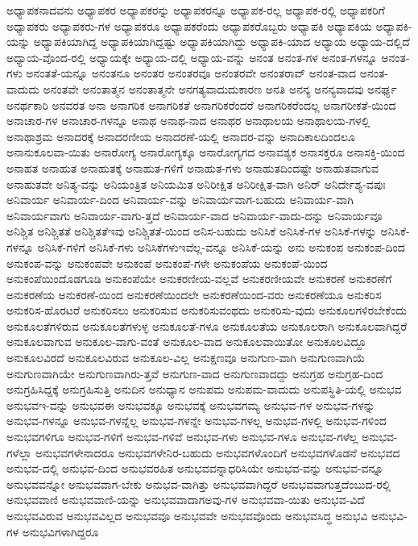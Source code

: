 {ಅಧ್ಯಾಪಕನಾದವನು
ಅಧ್ಯಾಪಕರ
ಅಧ್ಯಾಪಕರನ್ನು
ಅಧ್ಯಾಪಕರನ್ನೂ
ಅಧ್ಯಾಪಕ-ರಲ್ಲ
ಅಧ್ಯಾಪಕ-ರಲ್ಲಿ
ಅಧ್ಯಾಪಕರಿಗೆ
ಅಧ್ಯಾಪಕರು
ಅಧ್ಯಾಪಕರು-ಗಳ
ಅಧ್ಯಾಪಕರೂ
ಅಧ್ಯಾಪಕರೆಂದು
ಅಧ್ಯಾಪಕರೊಬ್ಬರು
ಅಧ್ಯಾಪಕಿ
ಅಧ್ಯಾಪಕಿಯ
ಅಧ್ಯಾಪಕಿ-ಯನ್ನು
ಅಧ್ಯಾಪಕಿಯಾಗಿದ್ದ
ಅಧ್ಯಾಪಕಿಯಾಗಿದ್ದಷ್ಟು
ಅಧ್ಯಾಪಕಿಯಾಗಿದ್ದು
ಅಧ್ಯಾಪಕಿ-ಯಾದ
ಅಧ್ಯಾಯ
ಅಧ್ಯಾಯ-ದಲ್ಲಿದೆ
ಅಧ್ಯಾಯ-ವೊಂದ-ರಲ್ಲಿ
ಅಧ್ಯಾಯಕ್ಕೇ
ಅಧ್ಯಾಯ-ದಲ್ಲಿ
ಅಧ್ಯಾಯ-ವನ್ನು
ಅನಂತ
ಅನಂತ-ಗಳ
ಅನಂತ-ಗಳನ್ನೂ
ಅನಂತ-ಗಳು
ಅನಂತತೆ-ಯನ್ನೂ
ಅನಂತನೂ
ಅನಂತರ
ಅನಂತರವೂ
ಅನಂತರವೇ
ಅನಂತರಾವ್
ಅನಂತ-ವಾದ
ಅನಂತ-ವಾದುದು
ಅನಂತವೇ
ಅನಂತಾತ್ಮನ
ಅನಂತಾತ್ಮನೇ
ಅನಗತ್ಯವಾದುದುಕಾರಣ
ಅನತಿ
ಅನನ್ಯ
ಅನನ್ಯವಾದವು
ಅನರ್ಘ್ಯ
ಅನರ್ಥಕಾರಿ
ಅನವರತ
ಅನಾ
ಅನಾಗರಿಕ
ಅನಾಗರಿಕತೆ
ಅನಾಗರಿಕರೆಂದರೆ
ಅನಾಗರಿಕರೆಂದಲ್ಲ
ಅನಾಗರೀಕತೆ-ಯಿಂದ
ಅನಾಚಾರ-ಗಳ
ಅನಾಚಾರ-ಗಳನ್ನೂ
ಅನಾಥ
ಅನಾಥ-ನಾದ
ಅನಾಥರ
ಅನಾಥಾಲಯ
ಅನಾಥಾಲಯ-ಗಳಲ್ಲಿ
ಅನಾಥಾಶ್ರಮ
ಅನಾದರಕ್ಕೆ
ಅನಾದರಣೀಯ
ಅನಾದರಣೆ-ಯಲ್ಲಿ
ಅನಾದರ-ವನ್ನು
ಅನಾದಿಕಾಲದಿಂದಲೂ
ಅನಾನುಕೂಲವಾ-ಯಿತು
ಅನಾರೋಗ್ಯ
ಅನಾರೋಗ್ಯಕ್ಕೂ
ಅನಾರೋಗ್ಯಗದ
ಅನಾವಶ್ಯಕ
ಅನಾಸಕ್ತರೂ
ಅನಾಸಕ್ತಿ-ಯಿಂದ
ಅನಾಹತ
ಅನಾಹುತ
ಅನಾಹುತಕ್ಕೆ
ಅನಾಹುತ-ಗಳಿಗೆ
ಅನಾಹುತ-ಗಳು
ಅನಾಹುತದಿಂದಷ್ಟೇ
ಅನಾಹುತವಾಗುವ
ಅನಾಹುತವೇ
ಅನಿತ್ಯ-ವನ್ನು
ಅನಿಯಂತ್ರಿತ
ಅನಿಯಮಿತ
ಅನಿರೀಕ್ಷಿತ
ಅನಿರೀಕ್ಷಿತ-ವಾಗಿ
ಅನಿರ್
ಅನಿರ್ದೇಶ್ಯ-ವಪುಃ
ಅನಿವಾರ್ಯ
ಅನಿವಾರ್ಯ-ದಿಂದ
ಅನಿವಾರ್ಯ-ವನ್ನು
ಅನಿವಾರ್ಯವಾಗ-ಬಹುದು
ಅನಿವಾರ್ಯ-ವಾಗಿ
ಅನಿವಾರ್ಯವಾಗು
ಅನಿವಾರ್ಯ-ವಾಗು-ತ್ತದೆ
ಅನಿವಾರ್ಯ-ವಾದ
ಅನಿವಾರ್ಯ-ವಾದು-ದನ್ನು
ಅನಿವಾರ್ಯವೂ
ಅನಿಶ್ಚಿತ
ಅನಿಶ್ಚಿತತೆ
ಅನಿಶ್ಚಿತತೆಇವು
ಅನಿಶ್ಚಿತತೆ-ಯಿಂದ
ಅನಿಸ-ಬಹುದು
ಅನಿಸಿಕೆ
ಅನಿಸಿಕೆ-ಗಳ
ಅನಿಸಿಕೆ-ಗಳನ್ನು
ಅನಿಸಿಕೆ-ಗಳನ್ನೂ
ಅನಿಸಿಕೆ-ಗಳಿಗೆ
ಅನಿಸಿಕೆ-ಗಳು
ಅನಿಸಿಕೆಗಳುಇವೆಲ್ಲ-ವನ್ನೂ
ಅನಿಸಿಕೆ-ಯನ್ನು
ಅನು
ಅನುಕಂಪ
ಅನುಕಂಪ-ದಿಂದ
ಅನುಕಂಪ-ವನ್ನು
ಅನುಕಂಪವೇ
ಅನುಕಂಪೆ
ಅನುಕಂಪೆ-ಗಳೇ
ಅನುಕಂಪೆಯ
ಅನುಕಂಪೆ-ಯಿಂದ
ಅನುಕಂಪೆಯಿಂದೊಡಗೂಡಿ
ಅನುಕಂಪೆಯೇ
ಅನುಕರಣೀಯ-ವಲ್ಲವೆ
ಅನುಕರಣೀಯವೇ
ಅನುಕರಣೆ
ಅನುಕರಣೆಗೆ
ಅನುಕರಣೆಯ
ಅನುಕರಣೆ-ಯಿಂದ
ಅನುಕರಣೆಯಿಂದಲೇ
ಅನುಕರಣೆಯಿಂದ-ವರು
ಅನುಕರಣೆಯೂ
ಅನುಕರಿಸ
ಅನುಕರಿಸ-ಹೊರಟರೆ
ಅನುಕರಿಸಲು
ಅನುಕರಿಸುವ
ಅನುಕರಿಸುವಂಥದು
ಅನುಕರಿಸು-ವುದು
ಅನುಕೂಲಗಳಿರಬೇಕೆಂದು
ಅನುಕೂಲತೆಗಳಿರುವ
ಅನುಕೂಲತೆಗಳುಳ್ಳ
ಅನುಕೂಲತೆ-ಗಳೂ
ಅನುಕೂಲತೆಯ
ಅನುಕೂಲರಾಗಿ
ಅನುಕೂಲವಾಗಿದ್ದರೆ
ಅನುಕೂಲವಾಗುವ
ಅನುಕೂಲ-ವಾಗು-ವಂತೆ
ಅನುಕೂಲ-ವಾದ
ಅನುಕೂಲವಾಯಿತೋ
ಅನುಕೂಲವಿದ್ದೂ
ಅನುಕೂಲವಿರದೆ
ಅನುಕೂಲವಿರುವ
ಅನುಕೂಲ-ವಿಲ್ಲ
ಅನುಕ್ಷಣವೂ
ಅನುಗುಣ-ವಾಗಿ
ಅನುಗುಣವಾಗಿಯೆ
ಅನುಗುಣವಾಗಿಯೇ
ಅನುಗುಣವಾಗಿರು-ತ್ತವೆ
ಅನುಗುಣ-ವಾದ
ಅನುಗುಣವಾದದ್ದು
ಅನುಗ್ರಹ
ಅನುಗ್ರಹ-ದಿಂದ
ಅನುಗ್ರಹಿಸಿದ್ದಕ್ಕೆ
ಅನುಗ್ರಹಿಸುತ್ತಿ
ಅನುದಿನ
ಅನುಧ್ಯಾನ
ಅನುಪಮ
ಅನುಪಮ-ವಾದುದು
ಅನುಪಸ್ಥಿತಿ-ಯಲ್ಲಿ
ಅನುಭವ
ಅನುಭವಇ-ವನ್ನು
ಅನುಭವಈ
ಅನುಭವಕ್ಕೂ
ಅನುಭವಕ್ಕೆ
ಅನುಭವಗಮ್ಯ
ಅನುಭವ-ಗಳ
ಅನುಭವ-ಗಳನ್ನು
ಅನುಭವ-ಗಳನ್ನೂ
ಅನುಭವ-ಗಳನ್ನೆಲ್ಲ
ಅನುಭವ-ಗಳನ್ನೇ
ಅನುಭವ-ಗಳಲ್ಲ
ಅನುಭವ-ಗಳಲ್ಲಿ
ಅನುಭವ-ಗಳಿಂದ
ಅನುಭವಗಳಿಗೂ
ಅನುಭವ-ಗಳಿಗೆ
ಅನುಭವ-ಗಳಿವೆ
ಅನುಭವ-ಗಳು
ಅನುಭವ-ಗಳೂ
ಅನುಭವ-ಗಳೆಲ್ಲ
ಅನುಭವ-ಗಳೆಲ್ಲಾ
ಅನುಭವಗಳೇನಾದರೂ
ಅನುಭವಗಳೇನಿರ-ಬಹುದು
ಅನುಭವಗಳೊಂದಿಗೆ
ಅನುಭವಗಳೊಡನೆ
ಅನುಭವದ
ಅನುಭವ-ದಲ್ಲಿ
ಅನುಭವ-ದಿಂದ
ಅನುಭವರಹಿತ
ಅನುಭವವನ್ನಾಧರಿಸಿಯೇ
ಅನುಭವ-ವನ್ನು
ಅನುಭವ-ವನ್ನೂ
ಅನುಭವವನ್ನೋ
ಅನುಭವವಾಗ-ಬೇಕು
ಅನುಭವ-ವಾಗಿತ್ತು
ಅನುಭವವಾಗಿದ್ದರೆ
ಅನುಭವವಾಗುತ್ತದೆಂಬುದ-ರಲ್ಲಿ
ಅನುಭವವಾಣಿ
ಅನುಭವವಾಣಿ-ಯನ್ನು
ಅನುಭವವಾದಾಗಅವು-ಗಳ
ಅನುಭವವಾ-ಯಿತು
ಅನುಭವ-ವಿದೆ
ಅನುಭವವಿರುವ
ಅನುಭವವಿಲ್ಲದ
ಅನುಭವವೂ
ಅನುಭವವೇ
ಅನುಭವವೊಂದು
ಅನುಭವಸಿದ್ಧ
ಅನುಭವಿ
ಅನುಭವಿ-ಗಳ
ಅನುಭವಿಗಳಾಗಿದ್ದರೂ
}
